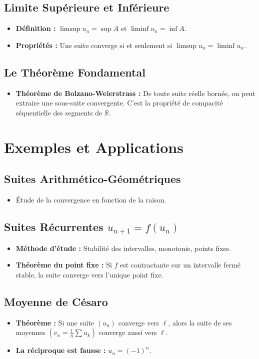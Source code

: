 \documentclass[12pt, a4paper, parskip=full]{report}
\theoremstyle{agregstyle}
\begin{document}
\subsection{Limite Supérieure et Inférieure}
\begin{itemize}
    \item \textbf{Définition :} $\limsup u_n = \sup A$ et $\liminf u_n = \inf A$.
    \item \textbf{Propriétés :} Une suite converge si et seulement si $\limsup u_n = \liminf u_n$.
\end{itemize}
\subsection{Le Théorème Fondamental}
\begin{itemize}
    \item \textbf{Théorème de Bolzano-Weierstrass :} De toute suite réelle bornée, on peut extraire une sous-suite convergente. C'est la propriété de compacité séquentielle des segments de $\mathbb{R}$.
\end{itemize}

\section{Exemples et Applications}
\subsection{Suites Arithmético-Géométriques}
\begin{itemize}
    \item Étude de la convergence en fonction de la raison.
\end{itemize}
\subsection{Suites Récurrentes $u_{n+1}=f(u_n)$}
\begin{itemize}
    \item \textbf{Méthode d'étude :} Stabilité des intervalles, monotonie, points fixes.
    \item \textbf{Théorème du point fixe :} Si $f$ est contractante sur un intervalle fermé stable, la suite converge vers l'unique point fixe.
\end{itemize}
\subsection{Moyenne de Césaro}
\begin{itemize}
    \item \textbf{Théorème :} Si une suite $(u_n)$ converge vers $\ell$, alors la suite de ses moyennes $(v_n = \frac{1}{n}\sum u_k)$ converge aussi vers $\ell$.
    \item \textbf{La réciproque est fausse :} $u_n = (-1)^n$.
\end{itemize}
\end{document}
